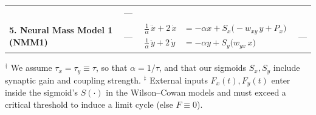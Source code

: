 \begin{landscape}
\begin{table}[p]
\begin{tabular}{@{}l  l  l  l@{}}
          & --- 
        \\[2ex]



        \addlinespace[2ex]
        \textbf{5. Neural Mass Model 1 (NMM1)} \cite{molaee-ardekani_computational_2010}
        & --- 
        & $\displaystyle
          \begin{aligned}
            \frac{1}{\alpha}\,\ddot{x} + 2\,\dot{x}
              &= - \alpha x + S_x\bigl( - w_{xy}\,y + P_x\bigr) \\
            \frac{1}{\alpha}\,\ddot{y} + 2\,\dot{y}
              &= - \alpha y + S_y\bigl(w_{yx}\,x \bigr) 
          \end{aligned}$
        & --- 
        \\[2ex]

    \end{tabular}

    \vspace{1ex}
    \parbox{\textwidth}{\footnotesize
    $^{\dagger}$ We assume $\tau_x = \tau_y \equiv \tau$, so that $\alpha = 1/\tau$, and that our sigmoids $S_x, S_y$ include synaptic gain and coupling strength.
    $^{\ddagger}$ External inputs $F_x(t),F_y(t)$ enter inside the sigmoid's $S(\cdot)$ in the Wilson–Cowan models and must exceed a critical threshold to induce a limit cycle (else $F\equiv0$).}
\end{table}
\end{landscape}

